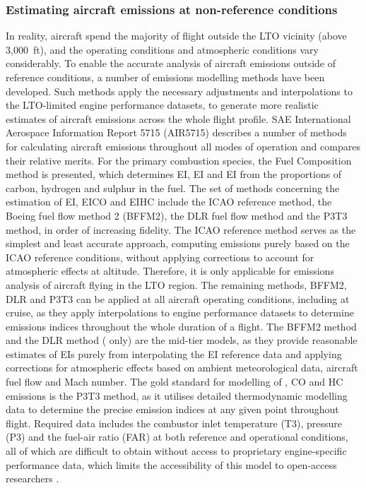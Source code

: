 \subsubsection{Estimating aircraft emissions at non-reference conditions}
In reality, aircraft spend the majority of flight outside the LTO vicinity (above 3,000~ft), and the operating conditions and atmospheric conditions vary considerably. To enable the accurate analysis of aircraft emissions outside of reference conditions, a number of emissions modelling methods have been developed. Such methods apply the necessary adjustments and interpolations to the LTO-limited engine performance datasets, to generate more realistic estimates of aircraft emissions across the whole flight profile. SAE International Aerospace Information Report 5715 (AIR5715) \cite{AIR5715} describes a number of methods for calculating aircraft emissions throughout all modes of operation and compares their relative merits. For the primary combustion species, the Fuel Composition method is presented, which determines EI, EI and EI from the proportions of carbon, hydrogen and sulphur in the fuel. The set of methods concerning the estimation of EI, EICO and EIHC include the ICAO reference method, the Boeing fuel flow method 2 (BFFM2), the DLR fuel flow method and the P3T3 method, in order of increasing fidelity. The ICAO reference method serves as the simplest and least accurate approach, computing emissions purely based on the ICAO reference conditions, without applying corrections to account for atmospheric effects at altitude. Therefore, it is only applicable for emissions analysis of aircraft flying in the LTO region.  The remaining methods, BFFM2, DLR and P3T3 can be applied at all aircraft operating conditions, including at cruise, as they apply interpolations to engine performance datasets to determine emissions indices throughout the whole duration of a flight. The BFFM2 method and the DLR method ( only) are the mid-tier models, as they provide reasonable estimates of EIs purely from interpolating the EI reference data and applying corrections for atmospheric effects based on ambient meteorological data, aircraft fuel flow and Mach number. The gold standard for modelling of , CO and HC emissions is the P3T3 method, as it utilises detailed thermodynamic modelling data to determine the precise emission indices at any given point throughout flight. Required data includes the combustor inlet temperature (T3), pressure (P3) and the fuel-air ratio (FAR) at both reference and operational conditions, all of which are difficult to obtain without access to proprietary engine-specific performance data, which limits the accessibility of this model to open-access researchers \cite{Brink2020, DuBois2006}.

